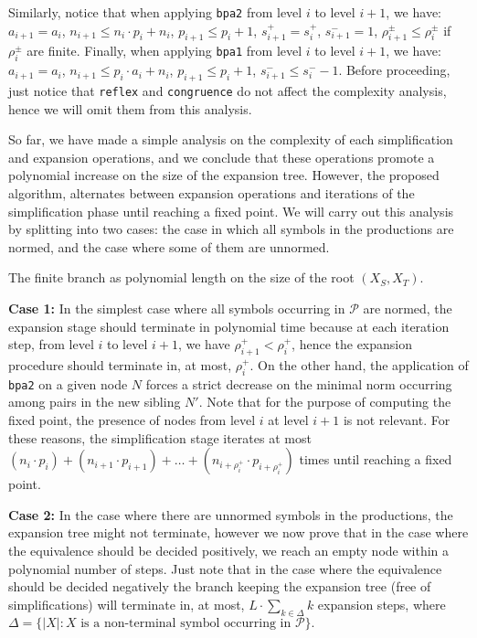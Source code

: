 Similarly, notice that when applying \lstinline{bpa2} from level $i$
to level $i+1$, we have: $a_{i+1}=a_i$, $n_{i+1} \leq n_i\cdot p_i + n_i$,
$p_{i+1} \leq p_i+1$, $s_{i+1}^+=s_i^+$, $s_{i+1}^-=1$, 
$\rho_{i+1}^\pm\leq \rho_i^\pm$ if $\rho_i^\pm$ are finite. 
Finally, when applying \lstinline{bpa1} from level $i$
to level $i+1$, we have: $a_{i+1}=a_i$, $n_{i+1} \leq p_i \cdot a_i+n_i$,
$p_{i+1}\leq p_i+1$, $s_{i+1}^- \leq s_i^- - 1$.
Before proceeding, just notice that \lstinline{reflex} and 
\lstinline{congruence} do not affect the complexity analysis, hence 
we will omit them from this analysis.

So far, we have made a simple analysis on the complexity of each 
simplification and expansion operations, and we conclude that
these operations promote a polynomial increase on the size of the
expansion tree. 
However, the proposed algorithm, alternates between expansion 
operations and iterations of the simplification phase until 
reaching a fixed point. We will carry out this analysis by 
splitting into two cases: the case in which all symbols 
in the productions are normed, and the case where some
of them are unnormed.\smallskip

\begin{theorem}
	The finite branch as polynomial length on the size of the root
	$(X_S,X_T)$.
\end{theorem}

\noindent\textbf{Case 1:} In the simplest case where all symbols
occurring in $\mathcal{P}$ are normed, the expansion stage should 
terminate in polynomial time because at each iteration step, from level 
$i$ to level $i+1$, we have $\rho_{i+1}^+ < \rho_i^+$, 
hence the expansion procedure should terminate in, at most, $\rho_i^+$.
On the other hand, the application of \lstinline{bpa2} 
on a given node $N$ forces a strict decrease on the minimal
norm occurring among pairs in the new sibling $N'$. 
Note that for the purpose of computing the fixed point, the
presence of nodes from level $i$ at level $i+1$ is not relevant.
For these reasons, the simplification stage iterates at most 
$(n_i\cdot p_i)+ (n_{i+1}\cdot p_{i+1}) +
\ldots + (n_{i+\rho_i^+}\cdot p_{i+\rho_i^+})$ 
times until reaching a fixed point. \smallskip

\noindent\textbf{Case 2:} In the case where there are unnormed symbols
in the productions, the expansion tree might not terminate, however
we now prove that in the case where the equivalence should be decided
positively, we reach an empty node within a polynomial number of steps.
Just note that in the case where the equivalence should be decided negatively
the branch keeping the expansion tree (free of simplifications) will
terminate in, at most, $L\cdot \sum_{k\in\Delta} k$ expansion steps, 
where $\Delta = \{|X| : X \text{ is a non-terminal symbol 
occurring in }\mathcal{P}\}.$

